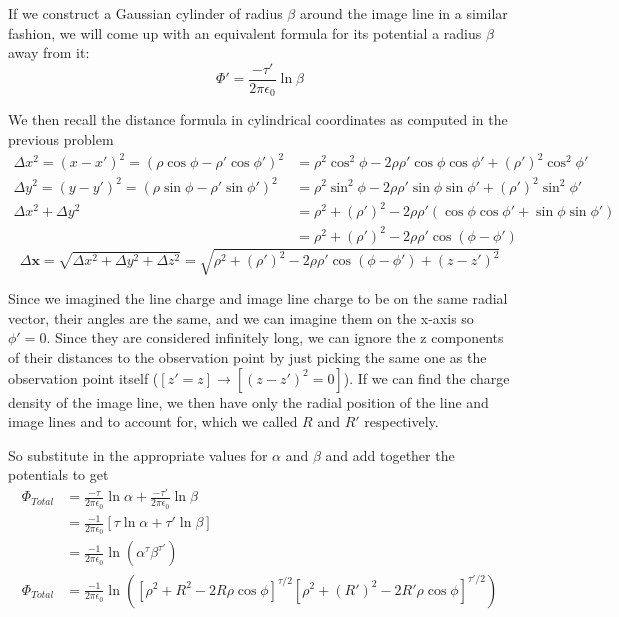 \documentclass{article}
\begin{document}
If we construct a Gaussian cylinder of radius $\beta$ around the image line in a similar fashion, we will come up with an equivalent formula for its potential a radius $\beta$ away from it:
\[ \Phi' = \frac{-\tau'}{2\pi\epsilon_{0}}\ln\beta \]

We then recall the distance formula in cylindrical coordinates as computed in the previous problem
\begin{align*}
\Delta x^{2} = (x-x')^{2} = (\rho\cos\phi - \rho'\cos\phi')^{2} &= \rho^{2}\cos^{2}\phi - 2\rho\rho'\cos\phi\cos\phi' + (\rho')^{2}\cos^{2}\phi'\\
\Delta y^{2} = (y-y')^{2} = (\rho\sin\phi - \rho'\sin\phi')^{2} &= \rho^{2}\sin^{2}\phi - 2\rho\rho'\sin\phi\sin\phi' + (\rho')^{2}\sin^{2}\phi'\\
\Delta x^{2} + \Delta y^{2} &= \rho^{2} + (\rho')^{2} - 2\rho\rho'(\cos\phi\cos\phi' + \sin\phi\sin\phi')\\
&= \rho^{2} + (\rho')^{2} - 2\rho\rho'\cos(\phi-\phi')
\end{align*}
\[ \Delta\mathbf{x} = \sqrt{\Delta x^{2} + \Delta y^{2} + \Delta z^{2}} = \sqrt{\rho^{2} + (\rho')^{2} - 2\rho\rho'\cos(\phi-\phi') + (z-z')^{2}} \]

Since we imagined the line charge and image line charge to be on the same radial vector, their angles are the same, and we can imagine them on the x-axis so $\phi'=0$. Since they are considered infinitely long, we can ignore the z components of their distances to the observation point by just picking the same one as the observation point itself ($[z'=z]\to[(z-z')^{2}=0]$). If we can find the charge density of the image line, we then have only the radial position of the line and image lines and to account for, which we called $R$ and $R'$ respectively.

So substitute in the appropriate values for $\alpha$ and $\beta$ and add together the potentials to get
\begin{align*}
\Phi_{Total} &= \frac{-\tau}{2\pi\epsilon_{0}}\ln\alpha + \frac{-\tau'}{2\pi\epsilon_{0}}\ln\beta\\
&= \frac{-1}{2\pi\epsilon_{0}}\left[ \tau\ln\alpha + \tau'\ln\beta \right]\\
&= \frac{-1}{2\pi\epsilon_{0}}\ln(\alpha^{\tau}\beta^{\tau'})\\
\Phi_{Total} &= \frac{-1}{2\pi\epsilon_{0}}\ln([\rho^{2} + R^{2} - 2R\rho\cos\phi]^{\tau/2}[\rho^{2} + (R')^{2} - 2R'\rho\cos\phi]^{\tau'/2})
\end{align*}
\end{document}
